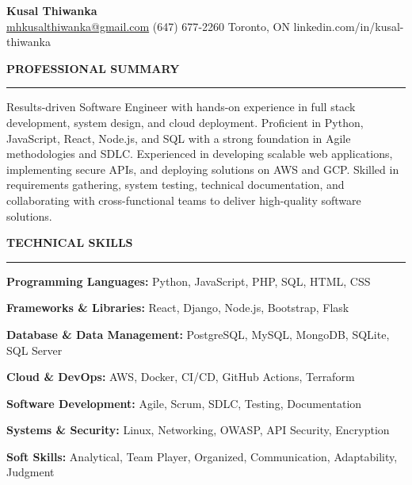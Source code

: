 \documentclass[10pt,letterpaper]{article}
\begin{document}
\begin{center}
{\LARGE\textbf{Kusal Thiwanka}}\\[3pt]
\href{mailto:mhkusalthiwanka@gmail.com}{mhkusalthiwanka@gmail.com}\hspace{2em}%
(647) 677{-}2260\hspace{2em}%
Toronto, ON\hspace{2em}
linkedin.com/in/kusal-thiwanka
\end{center}

\vspace{6pt}

\textbf{PROFESSIONAL SUMMARY}\\[-8pt]
\noindent\rule{\textwidth}{1pt}

\vspace{-2pt}

Results-driven Software Engineer with hands-on experience in full stack development, system design, and cloud deployment. Proficient in Python, JavaScript, React, Node.js, and SQL with a strong foundation in Agile methodologies and SDLC. Experienced in developing scalable web applications, implementing secure APIs, and deploying solutions on AWS and GCP. Skilled in requirements gathering, system testing, technical documentation, and collaborating with cross-functional teams to deliver high-quality software solutions.

\vspace{8pt}

\textbf{TECHNICAL SKILLS}\\[-8pt]
\noindent\rule{\textwidth}{1pt}

\vspace{-2pt}

\textbf{Programming Languages:} Python, JavaScript, PHP, SQL, HTML, CSS

\textbf{Frameworks \& Libraries:} React, Django, Node.js, Bootstrap, Flask

\textbf{Database \& Data Management:} PostgreSQL, MySQL, MongoDB, SQLite, SQL Server

\textbf{Cloud \& DevOps:} AWS, Docker, CI/CD, GitHub Actions, Terraform

\textbf{Software Development:} Agile, Scrum, SDLC, Testing, Documentation

\textbf{Systems \& Security:} Linux, Networking, OWASP, API Security, Encryption

\textbf{Soft Skills:} Analytical, Team Player, Organized, Communication, Adaptability, Judgment

\vspace{8pt}
\end{document}
